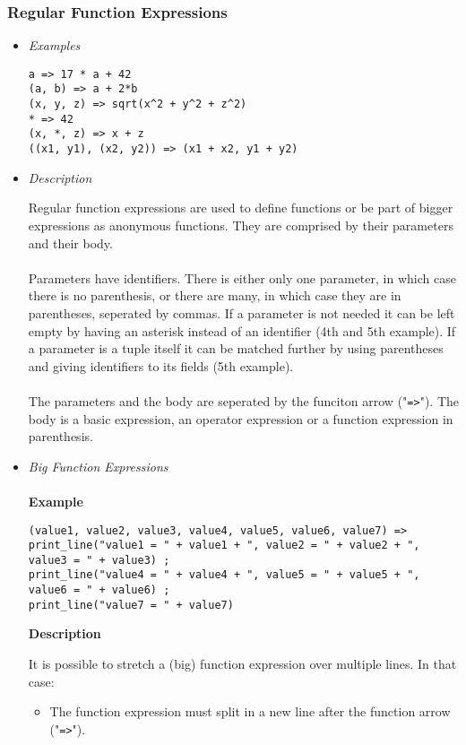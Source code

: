 \documentclass{article}
\begin{document}
\subsubsection{Regular Function Expressions}

\begin{itemize}
\item \textit{Examples}

\begin{verbatim}
a => 17 * a + 42
(a, b) => a + 2*b
(x, y, z) => sqrt(x^2 + y^2 + z^2)
* => 42
(x, *, z) => x + z
((x1, y1), (x2, y2)) => (x1 + x2, y1 + y2)
\end{verbatim}

\item \textit{Description}

Regular function expressions are used to define functions or be part of bigger
expressions as anonymous functions. They are comprised by their parameters and
their body.
\\\\
Parameters have identifiers. There is either only one parameter, in which case
there is no parenthesis, or there are many, in which case they are in
parentheses, seperated by commas. If a parameter is not needed it can be left
empty by having an asterisk instead of an identifier (4th and 5th example).
If a parameter is a tuple itself it can be matched further by using parentheses
and giving identifiers to its fields (5th example).
\\\\
The parameters and the body are seperated by the funciton arrow
("\verb|=>|"). The body is a basic expression, an operator expression or
a function expression in parenthesis.

\item \textit{Big Function Expressions}\\\\
\textbf{Example}

\begin{verbatim}
(value1, value2, value3, value4, value5, value6, value7) =>
print_line("value1 = " + value1 + ", value2 = " + value2 + ", value3 = " + value3) ;
print_line("value4 = " + value4 + ", value5 = " + value5 + ", value6 = " + value6) ;
print_line("value7 = " + value7)
\end{verbatim}

\textbf{Description}

It is possible to stretch a (big) function expression over multiple lines.
In that case:
\begin{itemize}
\item
The function expression must split in a new line after the function arrow
("\verb|=>|").


\end{itemize}
\end{itemize}
\end{document}
